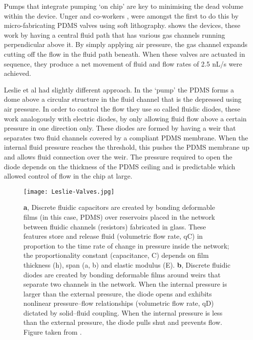 Pumps that integrate pumping ‘on chip’ are key to minimising the dead volume within the device.
Unger and co-workers \citep{RN59}, were amongst the first to do this by micro-fabricating PDMS valves
using soft lithography.  shows the devices, these work by having a central fluid path that has various gas
channels running perpendicular above it. By simply applying air pressure, the gas channel expands cutting off
the flow in the fluid path beneath. When these valves are actuated in sequence, they produce a
net movement of fluid and flow rates of 2.5 nL/s were achieved.

Leslie et al \citep{RN100} had slightly different
approach. In the ‘pump’ the PDMS forms
a dome above a circular structure in the fluid channel that is the depressed using air
pressure. In order to control the flow they use so called fluidic diodes, these work
analogously with electric diodes, by only allowing fluid flow above a certain pressure in
one direction only. These diodes are formed by having a weir that separates two fluid
channels covered by a compliant PDMS membrane. When the internal fluid pressure reaches the
threshold, this pushes the PDMS membrane up and allows fluid connection over the weir. The
pressure required to open the diode depends on the thickness of the PDMS ceiling and is
predictable which allowed control of flow in the chip at large.

\begin{figure}
\begin{center}
  \texttt{[image: Leslie-Valves.jpg]}
\end{center}
  \caption{\textbf{a}, Discrete fluidic capacitors are created by bonding deformable films (in
   this case, PDMS) over reservoirs placed in the network between fluidic channels (resistors)
    fabricated in glass. These features store and release fluid (volumetric flow rate, qC) in
    proportion to the time rate of change in pressure inside the network; the proportionality
    constant (capacitance, C) depends on film thickness (h), span (a, b) and elastic modulus
    (E). \textbf{b}, Discrete fluidic diodes are created by bonding deformable films around
    weirs that separate two channels in the network. When the internal pressure is larger than
    the external pressure, the diode opens and exhibits nonlinear pressure–flow relationships
    (volumetric flow rate, qD) dictated by solid–fluid coupling. When the internal pressure is
    less than the external pressure, the diode pulls shut and prevents flow. Figure taken from
    \citep{RN100}.}
  \label{fig:Ungar}
\end{figure}

